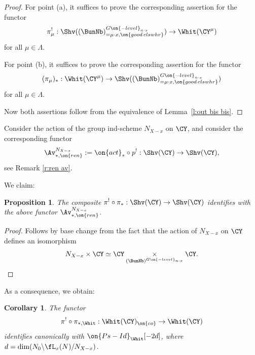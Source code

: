 \documentclass[9pt]{amsart}
\newtheorem{cor}[subsubsection]{Corollary}
\newtheorem{prop}[subsubsection]{Proposition}
\theoremstyle{definition}
\theoremstyle{remark}
\newcommand{\lemref}[1]{Lemma~\ref{#1}}
\numberwithin{equation}{section}
\begin{document}
\begin{proof}

For point (a), it suffices to prove the corresponding assertion for the functor
$$\pi_\mu^!:\Shv((\BunNb)^{G\on{-level}_{n\cdot x}}_{=\mu\cdot x,\on{good\,elswhr}})\to \Whit(\CY^\mu)$$
for all $\mu\in \Lambda$.

\medskip

For point (b), it suffices to prove the corresponding assertion for the functor
$$(\pi_\mu)_*:\Whit(\CY^\mu)\to \Shv((\BunNb)^{G\on{-level}_{n\cdot x}}_{=\mu\cdot x,\on{good\,elswhr}})$$
for all $\mu\in \Lambda$.

\medskip

Now both assertions follow from the equivalence of \lemref{l:out bis bis}.

\end{proof}

\sssec{}

Consider the action of the group ind-scheme $N_{X-x}$ on $\CY$, and consider the corresponding functor
$$\Av^{N_{X-x}}_{*,\on{ren}}:=\on{act}_*\circ p^!:\Shv(\CY)\to \Shv(\CY),$$
see Remark \ref{r:ren av}.

\medskip

We claim:

\begin{prop}  \label{p:pi and pi}
The composite $\pi^!\circ \pi_*:\Shv(\CY)\to \Shv(\CY)$ identifies with the above functor $\Av^{N_{X-x}}_{*,\on{ren}}$.
\end{prop}

\begin{proof}

Follows by base change from the fact that the action of $N_{X-x}$ on $\CY$ defines an isomorphism
$$N_{X-x}\times \CY\simeq \CY\underset{(\BunNb)^{G\on{-level}_{n\cdot x}}}\times \CY.$$

\end{proof}

As a consequence, we obtain: 

\begin{cor} \label{c:PsId glob}
The functor $$\pi^!\circ \pi_{*,\Whit}:\Whit(\CY)_{\on{co}}\to \Whit(\CY)$$ identifies canonically with 
$\on{Ps-Id}_{\Whit}[-2d]$, where $d=\dim(N_0\backslash \fL_x(N)/N_{X-x})$.
\end{cor}
\end{document}
